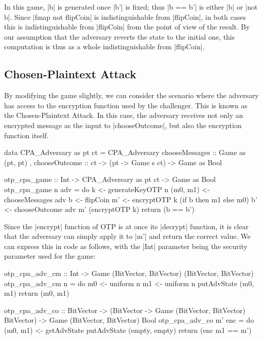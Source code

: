 In this game, |b| is generated once |b'| is fixed; thus |b == b'| is either |b| or |not b|.  Since |fmap not flipCoin|
is indistinguishable from |flipCoin|, in both cases this is indistinguishable from |flipCoin| from the point of view of
the result.  By our assumption that the adversary reverts the state to the initial one, this computation is thus as a
whole indistinguishable from |flipCoin|.

\subsection{Chosen-Plaintext Attack}

By modifying the game slightly, we can consider the scenario where the adversary has access to the encryption function
used by the challenger.  This is known as the Chosen-Plaintext Attack.  In this case, the adversary receives not only an
encrypted message as the input to |chooseOutcome|, but also the encryption function itself.
\begin{code}
data CPA_Adversary as pt ct  = CPA_Adversary
                             { chooseMessages  :: Game as (pt, pt)
                             , chooseOutcome   :: ct
                                               -> (pt -> Game s ct)
                                               -> Game as Bool
                             }

otp_cpa_game :: Int -> CPA_Adversary as pt ct -> Game as Bool
otp_cpa_game n adv = do
    k <- generateKeyOTP n
    (m0, m1) <- chooseMessages adv
    b <- flipCoin
    m' <- encryptOTP k (if b then m1 else m0)
    b' <- chooseOutcome adv m' (encryptOTP k)
    return (b == b')
\end{code}

Since the |encrypt| function of OTP is at once its |decrypt| function, it is clear that the adversary can simply apply
it to |m'| and return the correct value.  We can express this in code as follows, with the |Int| parameter being the
security parameter used for the game:
\begin{code}
    otp_cpa_adv_cm :: Int -> Game (BitVector, BitVector) (BitVector, BitVector)
    otp_cpa_adv_cm n = do
        m0 <- uniform n
        m1 <- uniform n
        putAdvState (m0, m1)
        return (m0, m1)

    otp_cpa_adv_co :: BitVector
                   -> (BitVector -> Game (BitVector, BitVector) BitVector)
                   -> Game (BitVector, BitVector) Bool
    otp_cpa_adv_co m' enc = do
        (m0, m1) <- getAdvState
        putAdvState (empty, empty)
        return (enc m1 == m')
\end{code}

